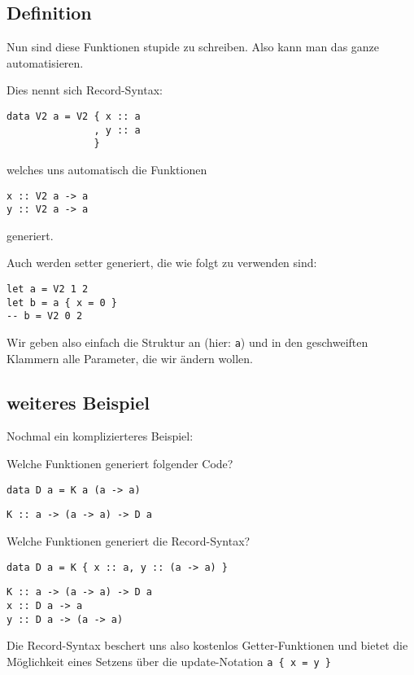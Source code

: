 \documentclass{beamer}
\begin{document}
\subsection{Definition}

\begin{frame}[fragile]
Nun sind diese Funktionen stupide zu schreiben. Also kann man das ganze automatisieren.\\\par
\pause
Dies nennt sich Record-Syntax:
\pause
\begin{verbatim}
data V2 a = V2 { x :: a
               , y :: a
               }
\end{verbatim}
\pause
welches uns automatisch die Funktionen
\begin{verbatim}
x :: V2 a -> a
y :: V2 a -> a
\end{verbatim}
generiert.
\end{frame}

\begin{frame}[fragile]
Auch werden setter generiert, die wie folgt zu verwenden sind:
\pause
\begin{verbatim}
let a = V2 1 2
let b = a { x = 0 }
-- b = V2 0 2
\end{verbatim}
\pause
Wir geben also einfach die Struktur an (hier: \texttt{a}) und in den geschweiften Klammern alle Parameter, die wir ändern wollen.
\end{frame}

\subsection{weiteres Beispiel}

\begin{frame}[fragile]
Nochmal ein komplizierteres Beispiel:\\\par
\pause
Welche Funktionen generiert folgender Code?
\begin{verbatim}
data D a = K a (a -> a)
\end{verbatim}
\pause
\begin{verbatim}
K :: a -> (a -> a) -> D a
\end{verbatim}
\pause
Welche Funktionen generiert die Record-Syntax?
\begin{verbatim}
data D a = K { x :: a, y :: (a -> a) }
\end{verbatim}
\pause
\begin{verbatim}
K :: a -> (a -> a) -> D a
x :: D a -> a
y :: D a -> (a -> a)
\end{verbatim}
\pause
Die Record-Syntax beschert uns also kostenlos Getter-Funktionen und bietet die Möglichkeit eines Setzens über die update-Notation \texttt{a \{ x = y \}}
\end{frame}
\end{document}
